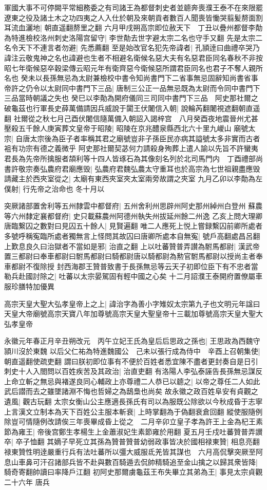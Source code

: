 軍國大事不可停闕平常細務委之有司諸王為都督刺史者並聼奔喪濮王泰不在來限罷遼東之役及諸土木之功四夷之人入仕於朝及來朝貢者數百人聞喪皆慟哭翦髪剺面割耳流血灑地|{
	朝直遥翻剺里之翻}
六月甲戌朔高宗即位赦天下　丁丑以疊州都督李勣為特進檢校洛州刺史洛陽宫留守|{
	李世勣去世字避太宗二名也守手又翻}
先是太宗二名令天下不連言者勿避|{
	先悉薦翻}
至是始改官名犯先帝諱者|{
	孔頴逹曰曲禮卒哭乃諱注云敬鬼神之名也諱避也生者不相避名衛候名惡大夫有名惡君臣同名春秋不非按昭七年衛候惡卒穀梁傳云昭元年有衛齊惡今衛候惡所謂君臣同名也君子不奪人親所名也}
癸未以長孫無忌為太尉兼檢校中書令知尚書門下二省事無忌固辭知尚書省事帝許之仍令以太尉同中書門下三品|{
	唐制三公正一品無忌既為太尉而令同中書門下三品當時朝議之失也}
癸巳以李勣為開府儀同三司同中書門下三品　阿史那社爾之破龜茲也行軍長史薛萬備請因兵威說于闐王伏闍信入朝|{
	說輪芮翻闍視遮翻朝直遥翻}
社爾從之秋七月己酉伏闍信隨萬備入朝詔入謁梓宫　八月癸酉夜地震晉州尤甚壓殺五千餘人庚寅葬文皇帝于昭陵|{
	昭陵在京兆醴泉縣西北六十里九嵕山}
廟號太宗|{
	自唐太宗後為臣子者率稱其君之廟號豈非子孫臣民亦病其謚號太多非實而古者袓有功宗有德之義微乎}
阿史那社爾契苾何力請殺身殉葬上遣人諭以先旨不許蠻夷君長為先帝所擒服者頡利等十四人皆琢石為其像刻名列於北司馬門内　丁酉禮部尚書許敬宗奏弘農府君廟應毁|{
	弘農府君魏弘農太守重耳也於高宗為七世祖親盡應毁}
請藏主於西夾室從之|{
	太廟有東西夾室夾太室兩旁故謂之夾室}
九月乙卯以李勣為左僕射|{
	行先帝之治命也}
冬十月以

突厥諸部置舍利等五州隸雲中都督府|{
	五州舍利州思辟州阿史那州綽州白登州}
蘇農等六州隸定襄都督府|{
	史只載蘇農州阿德州執失州拔延州餘二州逸}
乙亥上問大理卿唐臨繋囚之數對曰見囚五十餘人|{
	見賢遍翻}
唯二人應死上悦上嘗録繫囚前卿所處者多號呼稱寃臨所處者獨無言上怪問其故囚曰唐卿所處本自無寃|{
	號戶高翻處昌呂翻}
上歎息良久曰治獄者不當如是邪|{
	治直之翻}
上以吐蕃贊普弄讃為駙馬都尉|{
	漢武帝置三都尉曰奉車都尉曰駙馬都尉曰騎都尉唐以騎都尉為勲官駙馬都尉以授尚主者奉車都尉不復除授}
封西海郡王贊普致書于長孫無忌等云天子初即位臣下有不忠者當勒兵赴國討除之|{
	吐蕃以太宗晏駕固有輕中國之心矣}
十二月詔濮王泰開府置僚屬車服珍膳特加優異

高宗天皇大聖大弘孝皇帝上之上|{
	諱治字為善小字雉奴太宗第九子也文明元年諡曰天皇大帝廟號高宗天寶八年加尊號高宗天皇大聖皇帝十三載加尊號高宗天皇大聖大弘孝皇帝}


永徽元年春正月辛丑朔改元　丙午立妃王氏為皇后后思政之孫也|{
	王思政為西魏守頴川沒於東魏}
以后父仁祐為特進魏國公　己未以張行成為侍中　辛酉上召朝集使|{
	朝直遥翻使疏吏翻}
謂曰朕初即位事有不便於百姓者悉宜陳不盡者更封奏自是日引刺史十人入閤問以百姓疾苦及其政治|{
	治直吏翻}
有洛陽人李弘泰誣告長孫無忌謀反上命立斬之無忌與褚遂良同心輔政上亦尊禮二人恭已以聼之|{
	以帝之尊任二人如此武后譛而去之雖墜諸淵不悔也哲婦之為鴟梟也尚矣}
故永徽之政百姓阜安有貞觀之遺風|{
	觀古玩翻}
太宗女衡山公主應適長孫氏有司以為服既公除欲以今秋成昏于志寧上言漢文立制本為天下百姓公主服本斬衰|{
	上時掌翻為于偽翻衰倉回翻}
縱使服隨例除豈可情隨例改請俟三年喪畢成昏上從之　二月辛卯立皇子孝為許王上金為杞王素節為雍王|{
	帝後宫鄭生孝楊生上金蕭淑妃生素節雍於用翻}
夏五月壬戍吐蕃贊普弄讃卒|{
	卒子恤翻}
其嫡子早死立其孫為贊普贊普幼弱政事皆决於國相禄東贊|{
	相息亮翻}
禄東贊性明逹嚴重行兵有法吐蕃所以彊大威服氐羌皆其謀也　六月高侃擊突厥至阿息山車鼻可汗召諸部兵皆不赴與數百騎遁去侃帥精騎追至金山擒之以歸其衆皆降|{
	騎奇寄翻帥讀曰率降戶江翻}
初阿史那爾虜龜茲王布失畢立其弟為王|{
	事見太宗貞觀二十六年}
唐兵

